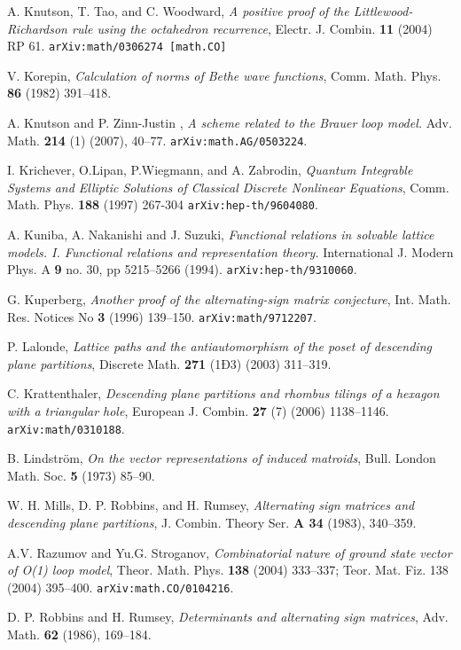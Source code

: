 \documentclass[12pt]{amsart}
\numberwithin{equation}{section}
\begin{document}
\begin{thebibliography}{10}
A. Knutson, T. Tao, and C. Woodward, 
\emph{A positive proof of the Littlewood-Richardson rule using the
  octahedron recurrence},   
Electr. J. Combin. \textbf{11} (2004) RP 61. 
{\tt arXiv:math/0306274 [math.CO]}

V. Korepin, {\em Calculation of norms of Bethe wave functions}, 
Comm. Math. Phys. {\bf 86} (1982) 391--418.

A. Knutson  and  P. Zinn-Justin , {\em A scheme related to the Brauer loop model.} 
Adv. Math. {\bf 214} (1) (2007), 40--77. 
{\tt arXiv:math.AG/0503224}.

 I. Krichever, O.Lipan, P.Wiegmann, and A. Zabrodin, 
\emph{Quantum Integrable Systems and Elliptic Solutions of Classical Discrete Nonlinear Equations},
Comm. Math. Phys. \textbf{188} (1997) 267-304 {\tt arXiv:hep-th/9604080}.

 A. Kuniba, A. Nakanishi and J. Suzuki, {\em Functional relations 
in solvable lattice models. I. Functional relations and representation theory.} 
International J. Modern Phys. A {\bf 9} no. 30, pp 5215--5266 (1994).
{\tt arXiv:hep-th/9310060}. 

 G. Kuperberg, {\em Another proof of the alternating-sign matrix conjecture},
Int. Math. Res. Notices No {\bf 3} (1996) 139--150.
{\tt    arXiv:math/9712207}.

P. Lalonde, {\em Lattice paths and the antiautomorphism of the poset of 
descending plane partitions}, Discrete Math. {\bf 271} (1Ð3) (2003) 311--319.

C. Krattenthaler, {\em Descending plane partitions and rhombus tilings of a 
hexagon with a triangular hole}, European J. Combin. {\bf 27} (7) (2006) 1138--1146.
{\tt arXiv:math/0310188}.

 B. Lindstr\"om, \emph{On the vector representations of
induced matroids}, Bull. London Math. Soc. \textbf{5} (1973)
85--90.

W. H. Mills, D. P. Robbins, and H. Rumsey, 
{\em Alternating sign matrices and descending plane partitions}, 
J. Combin. Theory Ser. {\bf A 34} (1983), 340--359.

A.V. Razumov and Yu.G. Stroganov, 
{\em Combinatorial nature of ground state vector of O(1) loop model}, 
Theor. Math. Phys. {\bf 138} (2004) 333--337; Teor. Mat. Fiz. 138 (2004) 395--400. 
{\tt arXiv:math.CO/0104216}.

D. P. Robbins and H. Rumsey, 
{\em Determinants and alternating sign matrices}, Adv. Math. {\bf 62} (1986), 169--184.


\end{thebibliography}
\end{document}
